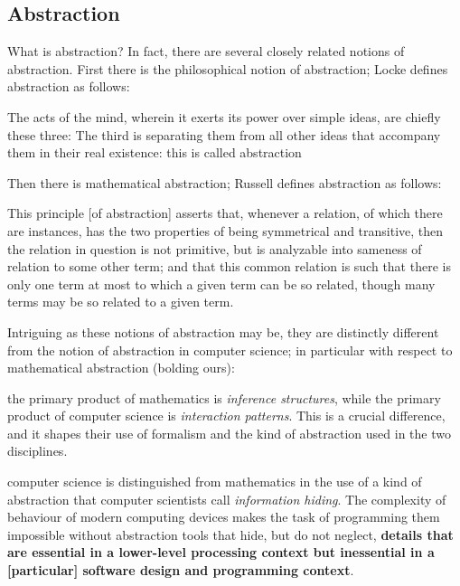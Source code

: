 \subsection{Abstraction}\label{subsec:abstraction}
What is abstraction?
In fact, there are several closely related notions of abstraction.
First there is the philosophical notion of abstraction;
Locke defines abstraction as follows:
\begin{displayquote}
    The acts of the mind, wherein it exerts its power over simple ideas, are chiefly these three: \textellipsis
    The third is separating them from all other ideas that accompany them in their real existence: this is called abstraction \textellipsis
\end{displayquote}
Then there is mathematical abstraction;
Russell defines abstraction as follows:
\begin{displayquote}
    This principle [of abstraction] asserts that, whenever a relation, of which there are instances, has the two properties of being symmetrical and transitive, then the relation in question is not primitive, but is analyzable into sameness of relation to some other term;
    and that this common relation is such that there is only one term at most to which a given term can be so related, though many terms may be so related to a given term.
\end{displayquote}
Intriguing as these notions of abstraction may be, they are distinctly different from the notion of abstraction in computer science;
in particular with respect to mathematical abstraction (bolding ours):
\begin{displayquote}
    \textellipsis the primary product of mathematics is \textit{inference structures}, while the primary product of computer science is \textit{interaction patterns}.
    This is a crucial difference, and it shapes their use of formalism and the kind of abstraction used in the two disciplines.

    \vspace{4pt}

    \textellipsis computer science is distinguished from mathematics in the use of a kind of abstraction that computer scientists call \textit{information hiding}.
    The complexity of behaviour of modern computing devices makes the task of programming them impossible without abstraction tools that hide, but do not neglect, \textbf{details that are essential in a lower-level processing context but inessential in a [particular] software design and programming context}.
\end{displayquote}

